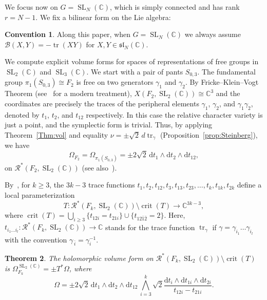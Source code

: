 \documentclass[11pt]{article}
\newtheorem{theo}{Theorem}[section]
\theoremstyle{definition}
\numberwithin{equation}{section}
\numberwithin{figure}{section}
\numberwithin{table}{section}
\DeclareMathOperator{\SL}{SL}
\DeclareMathOperator{\tr}{tr}
\DeclareMathOperator{\crit}{crit}
\newtheorem{conv}[theo]{Convention}}
\newcommand{\Bcal}{\mathcal{B}}
\newcommand{\Rcal}{\mathcal{R}}
\newcommand{\Cbb}{\mathbb{C}}
\newcommand{\slfrk}{\mathfrak{sl}}
\newcommand*{\dd}{\mathrm{d}}
\begin{document}
We focus now on $G=\SL_N (\Cbb)$, which is simply connected and has rank $r=N-1$. We fix a bilinear form on the Lie algebra:

\begin{conv}
Along this paper, when $G=\SL_N (\Cbb)$ we always assume $\Bcal(X,Y)=- \tr(XY)$ for $X,Y\in \slfrk_N (\Cbb)$.
\end{conv}


We compute explicit volume forms for spaces of representations of free groups in $\SL_2(\Cbb)$ and $\SL_3(\Cbb)$. We start with a pair of pants $S_{0,3}$. The fundamental group $\pi_1(S_{0,3})\cong F_2$ is free on two generators $\gamma_1$ and $\gamma_ 2$. By Fricke--Klein--Vogt Theorem \cite{Fricke, FrickeKlein, Vogt} (see~\cite{Goldman09,Magnus} for a modern treatment), $X(F_2, \SL_2(\Cbb))\cong\Cbb^3$ and the coordinates are precisely the traces of the peripheral elements $\gamma_1$, $\gamma_2$, and $\gamma_1\gamma_2$, denoted by $t_1$, $t_2$, and $t_{12}$ respectively. In this case the relative character variety is just a point, and the symplectic form is trivial. Thus, by applying Theorem~\ref{Thm:vol} and equality $
\nu=\pm\sqrt 2 \, d \tr_\gamma $ (Proposition~\ref{prop:Steinberg}), we have
\[
\Omega_{F_ 2} =\Omega_{\pi_1(S_{0,3})}=\pm 2\sqrt 2 \, \dd t_1\wedge \dd t_2\wedge \dd t_{12},
\]
on $\Rcal^*(F_2,\SL_2(\Cbb))$ (see also~\cite[4.3.1]{Marche2016}).


By~\cite{AcunaMontesinos}, for $k\!\geq\! 3$, the $3k-3$ trace functions $t_1,t_2,t_{12}, t_3,t_{13}, t_{23}, \dots, t_{k},t_{1k},t_{2k}$ define a local parameterization
\[
T\colon \Rcal^*(F_k,\SL_2(\Cbb)) \setminus \crit(T)
\to \Cbb^{3k-3},
\]
where $\crit(T) =\bigcup_{i\geq 3}\{ t_{12i}=t_{21i} \}\cup\{t_{12\bar1\bar2}=2\}$. Here, $t_{i_1\dots i_l}\colon \Rcal^*(F_k,\SL_2(\Cbb))\to\Cbb$ stands for the trace function $ \tr_\gamma$ if $\gamma = \gamma_{i_1}\dots\gamma_{i_l}$ with the convention $\gamma_{\,\bar i}=\gamma_i^{-1}$.

\begin{theo}\label{thm:F3SL2}
The holomorphic volume form on $\Rcal^*(F_k,\SL_2(\Cbb)) \setminus \crit(T)$ is $ \Omega_{F_k}^{\SL_2(\Cbb)}= \pm T^*\Omega$, where
\[
\Omega= \pm 2\sqrt{2}\, \dd t_1\wedge \dd t_2\wedge \dd t_{12} \, \bigwedge_{i=3}^k \sqrt{2} \frac{\dd t_i \wedge \dd t_{1i}\wedge \dd t_{2i} }{t_{12i}-t_{21i}}.
\]
\end{theo}
\end{document}
